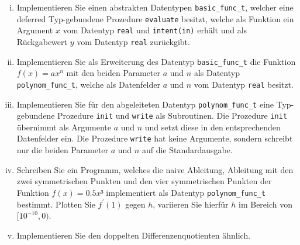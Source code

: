 \begin{question}[subtitle=Numerische Differentiation]
\begin{enumerate}[(i)]
\item Implementieren Sie einen abstrakten Datentypen \texttt{basic_func_t}, welcher eine deferred Typ-gebundene Prozedure \texttt{evaluate} besitzt, welche als Funktion ein Argument $x$ vom Datentyp \texttt{real} und \texttt{intent(in)} erhält und als Rückgabewert $y$ vom Datentyp \texttt{real} zurückgibt.
\item Implementieren Sie als Erweiterung des Datentyp \texttt{basic_func_t} die Funktion $f(x) = ax^n$ mit den beiden Parameter $a$ und $n$ als Datentyp \texttt{polynom_func_t}, welche als Datenfelder $a$ und $n$ vom Datentyp \texttt{real} besitzt.
\item Implementieren Sie für den abgeleiteten Datentyp \texttt{polynom_func_t} eine Typ-gebundene Prozedure \texttt{init} und \texttt{write} als Subroutinen.
  Die Prozedure \texttt{init} übernimmt als Argumente $a$ und $n$ und setzt diese in den entsprechenden Datenfelder ein.
  Die Prozedure \texttt{write} hat keine Argumente, sondern schreibt nur die beiden Parameter $a$ und $n$ auf die Standardausgabe.
\item Schreiben Sie ein Programm, welches die naive Ableitung, Ableitung mit den zwei symmetrischen Punkten und den vier symmetrischen Punkten der Funktion $f(x) = 0.5 x³$ implementiert als Datentyp \texttt{polynom_func_t} bestimmt.
  Plotten Sie $f^{'}(1)$ gegen $h$, variieren Sie hierfür $h$ im Bereich von $[10^{-10}, 0)$.
\item Implementieren Sie den doppelten Differenzenquotienten ähnlich.
\end{enumerate}
\end{question}

